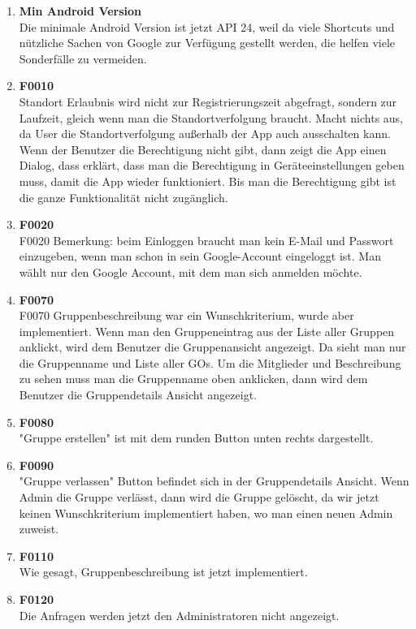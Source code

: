 \documentclass[11pt,a4paper]{scrartcl}
\begin{document}
\begin{enumerate}
	\item \textbf{Min Android Version} \\	
	Die minimale Android Version ist jetzt API 24, weil da viele Shortcuts und nützliche Sachen von Google zur Verfügung gestellt werden, die helfen viele Sonderfälle zu vermeiden.	
	
	\item \textbf{F0010}\\Standort Erlaubnis wird nicht zur Registrierungszeit abgefragt, sondern zur Laufzeit, gleich wenn man die Standortverfolgung braucht. Macht nichts aus, da User die Standortverfolgung außerhalb der App auch ausschalten kann.
Wenn der Benutzer die Berechtigung nicht gibt, dann zeigt die App einen Dialog, dass erklärt, dass man die Berechtigung in Geräteeinstellungen geben muss, damit die App wieder funktioniert. Bis man die Berechtigung gibt ist die ganze Funktionalität nicht zugänglich.
\item \textbf{F0020}\\
F0020 Bemerkung: beim Einloggen braucht man kein E-Mail und Passwort einzugeben, wenn man schon in sein Google-Account eingeloggt ist. Man wählt nur den Google Account, mit dem man sich anmelden möchte.
\item \textbf{F0070}\\
F0070 Gruppenbeschreibung war ein Wunschkriterium, wurde aber implementiert.
Wenn man den Gruppeneintrag aus der Liste aller Gruppen anklickt, wird dem Benutzer die Gruppenansicht angezeigt. Da sieht man nur die Gruppenname und Liste aller GOs. Um die Mitglieder und Beschreibung zu sehen muss man die Gruppenname oben anklicken, dann wird dem Benutzer die Gruppendetails Ansicht angezeigt.

\item \textbf{F0080}\\ "Gruppe erstellen" ist mit dem runden Button unten rechts dargestellt.

\item \textbf{F0090}\\ "Gruppe verlassen" Button befindet sich in der Gruppendetails Ansicht. Wenn Admin die Gruppe verlässt, dann wird die Gruppe gelöscht, da wir jetzt keinen Wunschkriterium implementiert haben, wo man einen neuen Admin zuweist.

\item \textbf{F0110}\\ Wie gesagt, Gruppenbeschreibung ist jetzt implementiert.

 \item \textbf{F0120}\\ Die Anfragen werden jetzt den Administratoren nicht angezeigt.


\end{enumerate}
\end{document}
